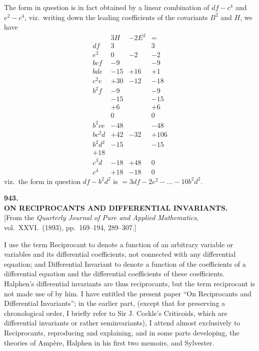 \documentclass[11pt]{article}
\begin{document}
The form in question is in fact obtained by a linear combination of $df - c^4$ and $e^2 - c^4$, viz.\ writing down the leading coefficients of the covariants $B^2$ and $H$, we have
\[
\begin{array}{l|rrr}
 & 3H & -2E^2 & =\\\hline
df & 3 & & 3\\
e^2 & 0 & -2 & -2\\
bcf & -9 & & -9\\
bde & -15 & +16 & +1\\
c^2e & +30 & -12 & -18\\
b^2f & -9 & & -9\\
& -15 & & -15\\
& +6 & & +6\\
& 0 & & 0\\
b^2ce & -48 & & -48\\
bc^2d & +42 & -32 & +106\\
b^2d^2 & -15 & & -15\\
+18 & & \\
c^3d & -18 & +48 & 0\\
c^4 & +18 & -18 & 0
\end{array}
\]
viz.\ the form in question $df - b^2d^2$ is $= 3df - 2e^2 - \ldots - 10b^2d^2$.

\bigskip
\begin{center}
\textbf{\large 943.}\\[4pt]
\textbf{ON RECIPROCANTS AND DIFFERENTIAL INVARIANTS.}\\[6pt]
[From the \textit{Quarterly Journal of Pure and Applied Mathematics}, vol.\ XXVI.\ (1893), pp.\ 169--194, 289--307.]
\end{center}

I use the term Reciprocant to denote a function of an arbitrary variable or variables and its differential coefficients, not connected with any differential equation; and Differential Invariant to denote a function of the coefficients of a differential equation and the differential coefficients of these coefficients. Halphen's differential invariants are thus reciprocants, but the term reciprocant is not made use of by him. I have entitled the present paper ``On Reciprocants and Differential Invariants''; in the earlier part, (except that for preserving a chronological order, I briefly refer to Sir J. Cockle's Criticoids, which are differential invariants or rather seminvariants), I attend almost exclusively to Reciprocants, reproducing and explaining, and in some parts developing, the theories of Amp\`ere, Halphen in his first two memoirs, and Sylvester.
\end{document}
